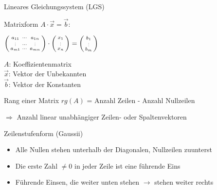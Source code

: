         \begin{definition}{Lineares Gleichungssystem (LGS)}
            
            Matrixform $A\cdot\vec{x}=\vec{b}$:

            
            \begin{minipage}{0.55\linewidth}
                $\begin{psmallmatrix} a_{11} & \cdots & a_{1n} \\ \scalebox{0.5}{\vdots} & \cdots & \scalebox{0.5}{\vdots} \\ a_{m1} & \cdots & a_{mn} \end{psmallmatrix} \cdot \begin{psmallmatrix}
                    x_1 \\ \scalebox{0.5}{\vdots} \\ x_n
                \end{psmallmatrix} = \begin{psmallmatrix}
                    b_1 \\ \scalebox{0.5}{\vdots} \\ b_m
                \end{psmallmatrix}$
            \end{minipage}
            \begin{minipage}
                {0.45\linewidth}
                {\small
                $A$: Koeffizientenmatrix\\
                $\vec{x}$: Vektor der Unbekannten\\
                $\vec{b}$: Vektor der Konstanten}
            \end{minipage}
        \end{definition}

    
        \begin{theorem}{Rang einer Matrix} $rg(A)$ = Anzahl Zeilen - Anzahl Nullzeilen
            
            $\Rightarrow$ Anzahl linear unabhängiger Zeilen- oder Spaltenvektoren
        \end{theorem}


\begin{concept}{Zeilenstufenform (Gaussii)}
    \begin{itemize}
        \item Alle Nullen stehen unterhalb der Diagonalen, Nullzeilen zuunterst
        \item Die erste Zahl $\neq 0$ in jeder Zeile ist eine führende Eins
        \item Führende Einsen, die weiter unten stehen $\rightarrow$ stehen weiter rechts
    \end{itemize}
\end{concept}

